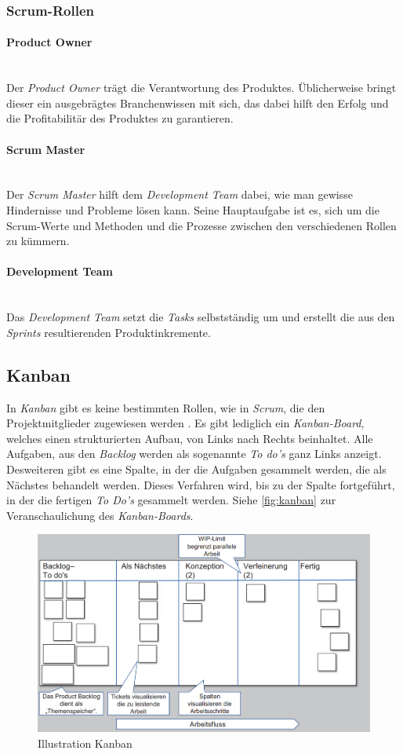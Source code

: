\subsubsection{Scrum-Rollen}
\paragraph{Product Owner}~\\
Der \textit{Product Owner} trägt die Verantwortung des Produktes. Üblicherweise bringt dieser ein ausgebrägtes Branchenwissen mit sich, das dabei hilft den Erfolg und die Profitabilitär des Produktes zu garantieren.
\paragraph{Scrum Master}~\\
Der \textit{Scrum Master} hilft dem \textit{Development Team} dabei, wie man gewisse Hindernisse und Probleme lösen kann. Seine Hauptaufgabe ist es, sich um die Scrum-Werte und Methoden und die Prozesse zwischen den verschiedenen Rollen zu kümmern.
\paragraph{Development Team}~\\
Das \textit{Development Team} setzt die \textit{Tasks} selbstständig um und erstellt die aus den \textit{Sprints} resultierenden Produktinkremente.

\subsection{Kanban}
In \textit{Kanban} gibt es keine bestimmten Rollen, wie in \textit{Scrum}, die den Projektmitglieder zugewiesen werden \cite{pm-agil-ursula}. Es gibt lediglich ein \textit{Kanban-Board}, welches einen strukturierten Aufbau, von Links nach Rechts beinhaltet. Alle Aufgaben, aus den \textit{Backlog} werden als sogenannte \textit{To do's} ganz Links anzeigt. Desweiteren gibt es eine Spalte, in der die Aufgaben gesammelt werden, die als Nächstes behandelt werden. Dieses Verfahren wird, bis zu der Spalte fortgeführt, in der die fertigen \textit{To Do's} gesammelt werden. Siehe \autoref{fig:kanban} zur Veranschaulichung des \textit{Kanban-Boards}. 
\begin{figure}[H]
	\centering
	\includegraphics[width=0.8\linewidth]{images/projektmanagement/kanban}
	\caption[Kanban]{Illustration Kanban \cite{pm-agil-ursula}}
	\label{fig:kanban}
\end{figure}

